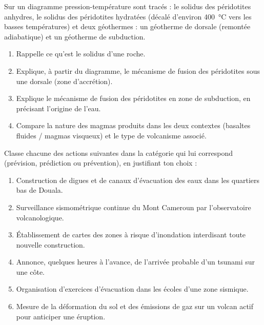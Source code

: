 \documentclass[11pt]{article}
\newcommand{\cle}[1]{{\popxbold\color{popdark}#1}}
\newcounter{popsec}
\newcounter{popsub}
\newcommand{\courssub}[1]{%
  \stepcounter{popsub}%
  \par\vspace{9pt}\noindent{\popxbold\fontsize{11.5}{13}\selectfont\color{popink}{\color{poporange}\thepopsec.\thepopsub}\hspace{6pt}#1}\par\nopagebreak\vspace{4pt}
}
\begin{document}
\begin{exercice}
Sur un diagramme pression-température sont tracés : le solidus des péridotites anhydres, le solidus des péridotites hydratées (décalé d'environ \SI{400}{\celsius} vers les basses températures) et deux géothermes : un géotherme de dorsale (remontée adiabatique) et un géotherme de subduction.
\begin{enumerate}
\item Rappelle ce qu'est le solidus d'une roche.
\item Explique, à partir du diagramme, le mécanisme de fusion des péridotites sous une dorsale (zone d'accrétion).
\item Explique le mécanisme de fusion des péridotites en zone de subduction, en précisant l'origine de l'eau.
\item Compare la nature des magmas produits dans les deux contextes (basaltes fluides / magmas visqueux) et le type de volcanisme associé.
\end{enumerate}
\end{exercice}

\begin{exercice}
Classe chacune des actions suivantes dans la catégorie qui lui correspond (\cle{prévision}, \cle{prédiction} ou \cle{prévention}), en justifiant ton choix :
\begin{enumerate}
\item Construction de digues et de canaux d'évacuation des eaux dans les quartiers bas de Douala.
\item Surveillance sismométrique continue du Mont Cameroun par l'observatoire volcanologique.
\item Établissement de cartes des zones à risque d'inondation interdisant toute nouvelle construction.
\item Annonce, quelques heures à l'avance, de l'arrivée probable d'un tsunami sur une côte.
\item Organisation d'exercices d'évacuation dans les écoles d'une zone sismique.
\item Mesure de la déformation du sol et des émissions de gaz sur un volcan actif pour anticiper une éruption.
\end{enumerate}
\end{exercice}

\courssub{Je me prépare au Bac}
\end{document}
